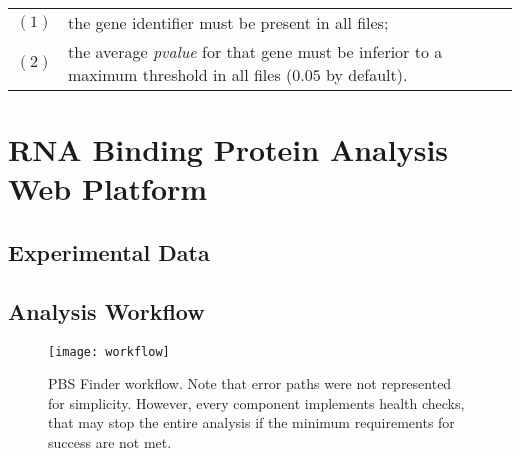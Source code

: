 \begin{table}[H]
  \begin{tabular}{l p{}}
    $(1)$ & the gene identifier must be present in all files;\\
    $(2)$ & the average \emph{pvalue} for that gene must be inferior to a
    maximum threshold in all files ($0.05$ by default).\\
  \end{tabular}
\end{table}

\section{RNA Binding Protein Analysis Web Platform}


\subsection{Experimental Data}

\subsection{Analysis Workflow}

\begin{figure}[!htb]
  \begin{center}
    \leavevmode
    \texttt{[image: workflow]}
    \caption[PBS Finder workflow]{
      PBS Finder workflow. Note that error paths were not represented for
      simplicity. However, every component implements health checks, that may
      stop the entire analysis if the minimum requirements for success are not
      met.
    }
    \label{fig:workflow}
  \end{center}
\end{figure}

